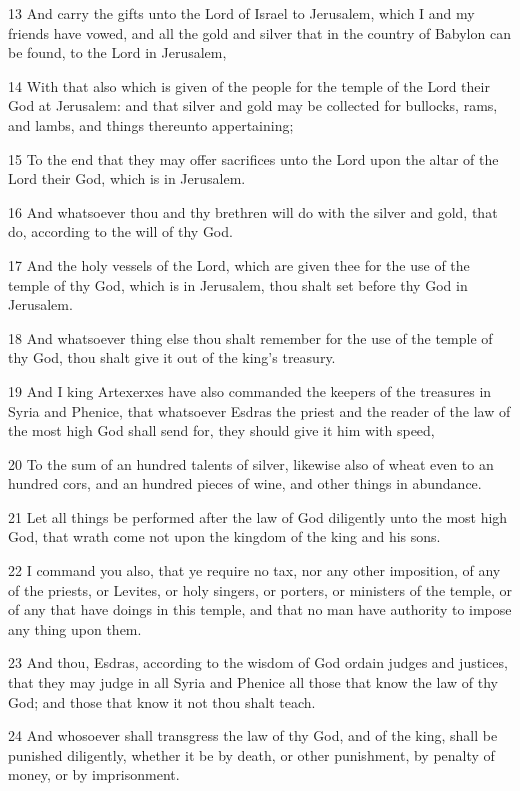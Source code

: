 \par 13 And carry the gifts unto the Lord of Israel to Jerusalem, which I and my friends have vowed, and all the gold and silver that in the country of Babylon can be found, to the Lord in Jerusalem,
\par 14 With that also which is given of the people for the temple of the Lord their God at Jerusalem: and that silver and gold may be collected for bullocks, rams, and lambs, and things thereunto appertaining;
\par 15 To the end that they may offer sacrifices unto the Lord upon the altar of the Lord their God, which is in Jerusalem.
\par 16 And whatsoever thou and thy brethren will do with the silver and gold, that do, according to the will of thy God.
\par 17 And the holy vessels of the Lord, which are given thee for the use of the temple of thy God, which is in Jerusalem, thou shalt set before thy God in Jerusalem.
\par 18 And whatsoever thing else thou shalt remember for the use of the temple of thy God, thou shalt give it out of the king's treasury.
\par 19 And I king Artexerxes have also commanded the keepers of the treasures in Syria and Phenice, that whatsoever Esdras the priest and the reader of the law of the most high God shall send for, they should give it him with speed,
\par 20 To the sum of an hundred talents of silver, likewise also of wheat even to an hundred cors, and an hundred pieces of wine, and other things in abundance.
\par 21 Let all things be performed after the law of God diligently unto the most high God, that wrath come not upon the kingdom of the king and his sons.
\par 22 I command you also, that ye require no tax, nor any other imposition, of any of the priests, or Levites, or holy singers, or porters, or ministers of the temple, or of any that have doings in this temple, and that no man have authority to impose any thing upon them.
\par 23 And thou, Esdras, according to the wisdom of God ordain judges and justices, that they may judge in all Syria and Phenice all those that know the law of thy God; and those that know it not thou shalt teach.
\par 24 And whosoever shall transgress the law of thy God, and of the king, shall be punished diligently, whether it be by death, or other punishment, by penalty of money, or by imprisonment.
